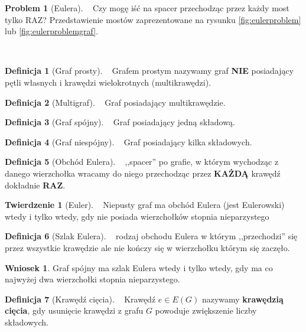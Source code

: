 \documentclass[a4paper,12pt]{article}
\theoremstyle{definition}%
\newtheorem{remark}{Wniosek}%
\newtheorem{theorem}{Twierdzenie}%
\theoremstyle{definition}
\newtheorem{definition}{Definicja}%
\theoremstyle{problem}
\newtheorem*{problem*}{Problem}
\begin{document}
\begin{problem*}[Eulera]~ %
Czy mogę iść na spacer przechodząc przez każdy most tylko RAZ?
Przedstawienie mostów zaprezentowane na rysunku \ref{fig:eulerproblem} lub \ref{fig:eulerproblemgraf}.
\end{problem*}~ %
\begin{definition}[Graf prosty]~ %
Grafem prostym nazywamy graf \textbf{NIE} posiadający pętli własnych i krawędzi wielokrotnych (multikrawędzi). 
\end{definition}
\begin{definition}[Multigraf]~ %
Graf posiadający multikrawędzie.
\end{definition}
\begin{definition}[Graf spójny]~ %
Graf posiadający jedną składową.
\end{definition}
\begin{definition}[Graf niespójny]~ %
Graf posiadający kilka składowych.
\end{definition}
\begin{definition}[Obchód Eulera]~ %
,,spacer'' po grafie, w którym wychodząc z danego wierzchołka wracamy do niego przechodząc przez \textbf{KAŻDĄ} krawędź dokładnie \textbf{RAZ}.
\end{definition}
\begin{theorem}[Euler]\label{the:euler}~ %
Niepusty graf ma obchód Eulera (jest Eulerowski) wtedy i tylko  wtedy, gdy nie posiada wierzchołków stopnia nieparzystego
\end{theorem}
\begin{definition}[Szlak Eulera]~ %
rodzaj obchodu Eulera w którym ,,przechodzi'' się przez wszystkie krawędzie ale nie kończy się w wierzchołku którym się zaczęło.
\end{definition}
\begin{remark}
Graf spójny ma szlak Eulera wtedy i tylko  wtedy, gdy ma co najwyżej dwa wierzchołki stopnia nieparzystego.
\end{remark}
\begin{definition}[Krawędź cięcia]~ %
Krawędź $e\in E(G)$ nazywamy \textbf{krawędzią cięcia}, gdy usunięcie krawędzi z grafu $G$ powoduje zwiększenie liczby składowych.
\end{definition}
\end{document}
